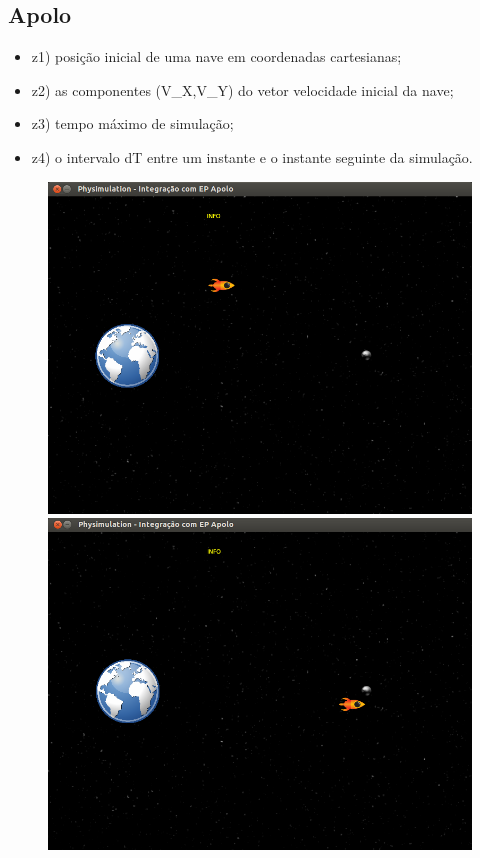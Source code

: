 \subsection{Apolo}

\begin{itemize}
  \item z1) posição inicial de uma nave em coordenadas cartesianas;                    
  \item z2) as componentes (V\_X,V\_Y) do vetor velocidade inicial da nave;
  \item z3) tempo máximo de simulação;               
  \item z4) o intervalo dT entre um instante e o instante seguinte da simulação.
\end{itemize}

\begin{figure}[H]
    \centering
	\includegraphics[scale=0.22]{images/apolo-4.png}
	\includegraphics[scale=0.22]{images/apolo-6.png}

\end{figure}
